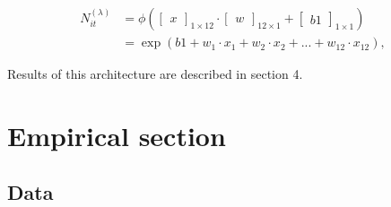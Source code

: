 \begin{align*}
N_{it}^{(\lambda)} &=  
\phi 
(
\begin{bmatrix}
x
\end{bmatrix}_{1 \times 12} \cdot
\begin{bmatrix}
w
\end{bmatrix}_{12 \times 1} +
\begin{bmatrix}
b1
\end{bmatrix}_{1 \times 1}
)\\
&= \exp(b1 + w_1 \cdot x_1 + w_2 \cdot x_2 + ... + w_{12} \cdot x_{12}),
\end{align*}

\noindent Results of this architecture are described in section 4.


\section{Empirical section}
\label{S:1.3}

\subsection{Data}
\label{sec3-1}



